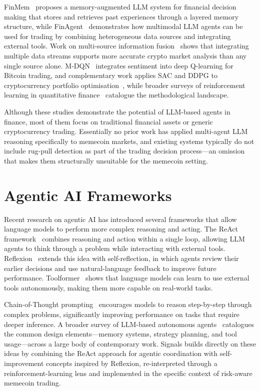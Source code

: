\documentclass[12pt,a4paper,oneside,openany]{book}
\begin{document}
FinMem~\cite{ref26} proposes a memory-augmented LLM system for financial decision making that stores and retrieves past experiences through a layered memory structure, while FinAgent~\cite{ref27} demonstrates how multimodal LLM agents can be used for trading by combining heterogeneous data sources and integrating external tools. Work on multi-source information fusion~\cite{ref17} shows that integrating multiple data streams supports more accurate crypto market analysis than any single source alone. M-DQN~\cite{ref14} integrates sentiment into deep Q-learning for Bitcoin trading, and complementary work applies SAC and DDPG to cryptocurrency portfolio optimisation~\cite{ref15}, while broader surveys of reinforcement learning in quantitative finance~\cite{ref16} catalogue the methodological landscape.

Although these studies demonstrate the potential of LLM-based agents in finance, most of them focus on traditional financial assets or generic cryptocurrency trading. Essentially no prior work has applied multi-agent LLM reasoning specifically to memecoin markets, and existing systems typically do not include rug-pull detection as part of the trading decision process---an omission that makes them structurally unsuitable for the memecoin setting.

\section{Agentic AI Frameworks}
Recent research on agentic AI has introduced several frameworks that allow language models to perform more complex reasoning and acting. The ReAct framework~\cite{ref28} combines reasoning and action within a single loop, allowing LLM agents to think through a problem while interacting with external tools. Reflexion~\cite{ref29} extends this idea with self-reflection, in which agents review their earlier decisions and use natural-language feedback to improve future performance. Toolformer~\cite{ref30} shows that language models can learn to use external tools autonomously, making them more capable on real-world tasks.

Chain-of-Thought prompting~\cite{ref31} encourages models to reason step-by-step through complex problems, significantly improving performance on tasks that require deeper inference. A broader survey of LLM-based autonomous agents~\cite{ref32} catalogues the common design elements---memory systems, strategy planning, and tool usage---across a large body of contemporary work. Signals builds directly on these ideas by combining the ReAct approach for agentic coordination with self-improvement concepts inspired by Reflexion, re-interpreted through a reinforcement-learning lens and implemented in the specific context of risk-aware memecoin trading.
\end{document}
